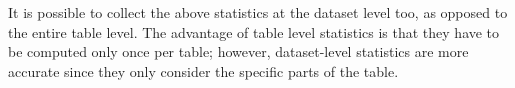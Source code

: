 \vspace{5 mm}


It is possible to collect the above statistics at the dataset level too, as
opposed to the entire table level. The advantage of table level statistics is
that they have to be computed only once per table; however, dataset-level
statistics are more accurate since they only consider the specific parts of the
table. 
